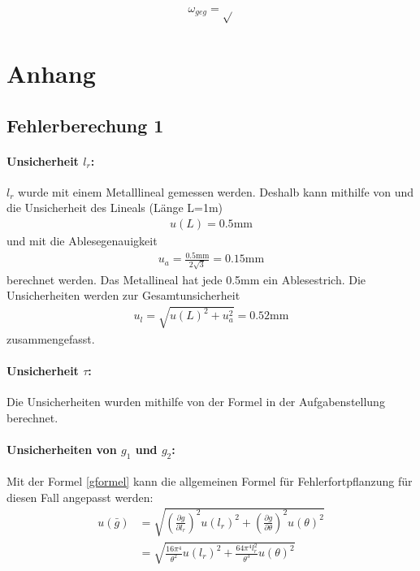 \documentclass[11pt, a4paper]{article}
\begin{document}
    \begin{align}
        \omega_{geg} = \sqrt{}
    \end{align}




    \section{Anhang}
    \subsection{Fehlerberechung 1}
    
    \paragraph{Unsicherheit $l_r$:}
    $l_r$ wurde mit einem Metalllineal gemessen werden. Deshalb kann mithilfe von \cite[Gleichung (40)]{ABW}
    und \cite[Tabelle 5]{ABW} die Unsicherheit des Lineals (Länge L=1m)
    \begin{align}
        u(L) = 0.5\si{\milli\metre}
    \end{align}
    und mit \cite[Tabelle 1]{ABW} die Ablesegenauigkeit
    \begin{align}
        u_a = \frac{0.5\si{\milli\metre}}{2\sqrt{3}} = 0.15\si{\milli\metre}
    \end{align}
    berechnet werden. Das Metallineal hat jede 0.5mm ein Ablesestrich.
    Die Unsicherheiten werden zur Gesamtunsicherheit
    \begin{align}
        u_l = \sqrt{u(L)^2 + u_a^2 } = 0.52\si{\milli\metre}
    \end{align} 
    zusammengefasst.
    \paragraph{Unsicherheit $\tau$:}
    Die Unsicherheiten wurden mithilfe von der Formel in der Aufgabenstellung \cite[Aufgabe 8]{pen} berechnet.

    \paragraph{Unsicherheiten von $g_1$ und $g_2$:}
    Mit der Formel \ref{gformel} kann die allgemeinen Formel für Fehlerfortpflanzung
     \cite[Formel (20)]{ABW} für diesen Fall angepasst werden:
     \begin{align}
         u(\bar{g}) &= \sqrt{\left(\frac{\partial g}{\partial l_r}\right)^2 u(l_r)^2 +
         \left(\frac{\partial g}{\partial \theta}\right)^2 u(\theta)^2} \nonumber \\
         &= \sqrt{\frac{16\pi^4}{\theta^2} u(l_r)^2 + \frac{64\pi^4l_r^2}{\theta^3} u(\theta)^2}
     \end{align}
\end{document}
